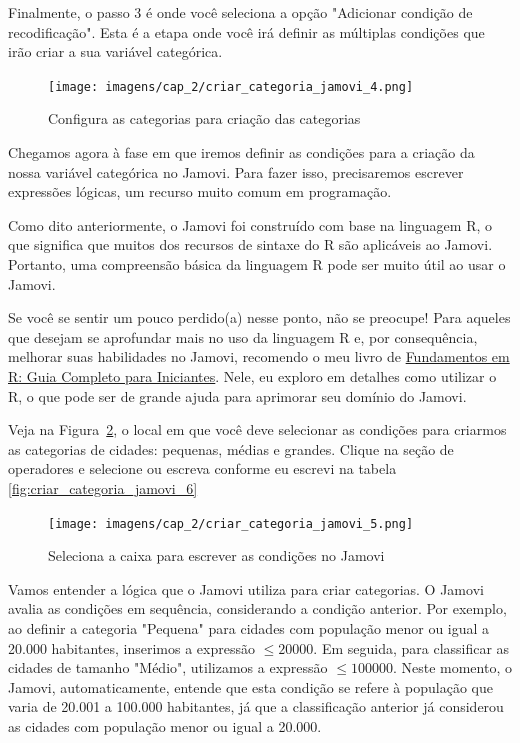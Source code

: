 Finalmente, o passo 3 é onde você seleciona a opção "Adicionar condição de recodificação". Esta é a etapa onde você irá definir as múltiplas condições que irão criar a sua variável categórica.

\begin{figure}[H]
    \centering
    \caption{Configura as categorias para criação das categorias}
    \texttt{[image: imagens/cap\_2/criar\_categoria\_jamovi\_4.png]}
    \label{fig:criar_categoria_jamovi_4}
\end{figure}

Chegamos agora à fase em que iremos definir as condições para a criação da nossa variável categórica no Jamovi. Para fazer isso, precisaremos escrever expressões lógicas, um recurso muito comum em programação. 

Como dito anteriormente, o Jamovi foi construído com base na linguagem R, o que significa que muitos dos recursos de sintaxe do R são aplicáveis ao Jamovi. Portanto, uma compreensão básica da linguagem R pode ser muito útil ao usar o Jamovi.

Se você se sentir um pouco perdido(a) nesse ponto, não se preocupe! Para aqueles que desejam se aprofundar mais no uso da linguagem R e, por consequência, melhorar suas habilidades no Jamovi, recomendo o meu livro de \href{https://www.amazon.com.br/Fundamentos-Completo-Iniciantes-programa%C3%A7%C3%A3o-computa%C3%A7%C3%A3o-ebook/dp/B0B36NG18N}{Fundamentos em R: Guia Completo para Iniciantes}. Nele, eu exploro em detalhes como utilizar o R, o que pode ser de grande ajuda para aprimorar seu domínio do Jamovi.

Veja na Figura~\ref{fig:criar_categoria_jamovi_5}, o local em que você deve selecionar as condições para criarmos as categorias de cidades: pequenas, médias e grandes. Clique na seção de operadores e selecione ou escreva conforme eu escrevi na tabela \ref{fig:criar_categoria_jamovi_6}

\begin{figure}[H]
    \centering
    \caption{Seleciona a caixa para escrever as condições no Jamovi}
    \texttt{[image: imagens/cap\_2/criar\_categoria\_jamovi\_5.png]}
    \label{fig:criar_categoria_jamovi_5}
\end{figure}

Vamos entender a lógica que o Jamovi utiliza para criar categorias. O Jamovi avalia as condições em sequência, considerando a condição anterior.  Por exemplo, ao definir a categoria "Pequena" para cidades com população menor ou igual a 20.000 habitantes, inserimos a expressão $\leqslant 20000$. Em seguida, para classificar as cidades de tamanho "Médio", utilizamos a expressão $\leqslant 100000$. Neste momento, o Jamovi, automaticamente, entende que esta condição se refere à população que varia de 20.001 a 100.000 habitantes, já que a classificação anterior já considerou as cidades com população menor ou igual a 20.000.

